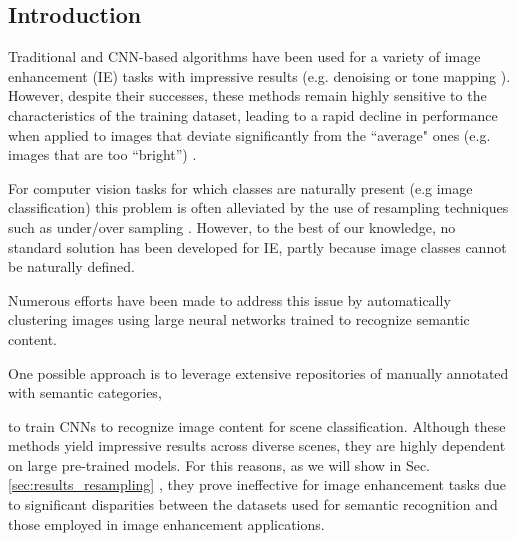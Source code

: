\documentclass[12pt]{spieman}  %
\begin{document}
\begin{spacing}{2}   %

\begin{linenumbers}



\section{Introduction}
\label{sec:introduction}  %
Traditional and CNN-based algorithms have been used for a variety of image enhancement (IE) tasks with impressive results (e.g. denoising \cite{chen2022simplebaselinesimagerestoration} or tone mapping \cite{Zhao2022, GharbiCBHD17}).
However, despite their successes, these methods remain highly sensitive to the characteristics of the training dataset, leading to a rapid decline in performance when applied to images that deviate significantly from the ``average" ones (e.g. images that are too ``bright”) \cite{hashmani2019accuracy}. 

For computer vision tasks for which classes are naturally present (e.g image classification)  this problem is often
alleviated by the use of resampling techniques such as under/over sampling \cite{Khan2023}. However, to the best of our knowledge, no standard solution has been developed for IE, partly because image classes cannot be naturally defined. 


 {Numerous efforts have been made to address this issue by automatically clustering images using large neural networks trained to recognize semantic content.

One possible approach is to leverage extensive repositories of manually annotated with semantic categories,  } \cite{ zhou2017places, zhou2018semanticunderstandingscenesade20k, lin2015microsoftcococommonobjects, 5539970}  { to train CNNs to recognize image content for scene classification. Although these methods yield impressive results across diverse scenes, they are highly dependent on large pre-trained models. For this reasons, as we will show in Sec.} \ref{sec:results_resampling} {, they prove ineffective for image enhancement tasks due to significant disparities between the datasets used for semantic recognition and those employed in image enhancement applications.}



\end{linenumbers}
\end{spacing}
\end{document}
